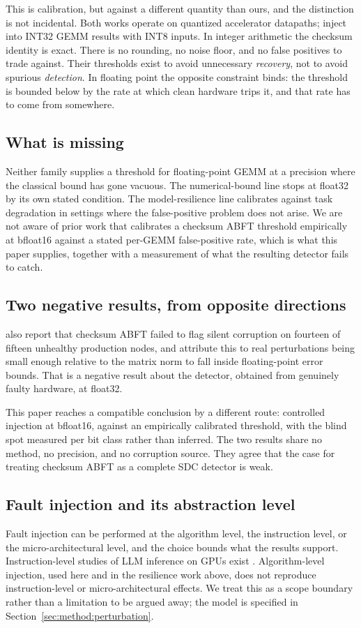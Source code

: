 This is calibration, but against a different quantity than ours, and the
distinction is not incidental. Both works operate on quantized accelerator
datapaths; \citet{xie2025realm} inject into INT32 GEMM results with INT8
inputs. In integer arithmetic the checksum identity is exact. There is no
rounding, no noise floor, and no false positives to trade against. Their
thresholds exist to avoid unnecessary \emph{recovery}, not to avoid spurious
\emph{detection}. In floating point the opposite constraint binds: the
threshold is bounded below by the rate at which clean hardware trips it, and
that rate has to come from somewhere.

\subsection{What is missing}

Neither family supplies a threshold for floating-point GEMM at a precision
where the classical bound has gone vacuous. The numerical-bound line stops at
float32 by its own stated condition. The model-resilience line calibrates
against task degradation in settings where the false-positive problem does not
arise. We are not aware of prior work that calibrates a checksum ABFT
threshold empirically at bfloat16 against a stated per-GEMM false-positive
rate, which is what this paper supplies, together with a measurement of what
the resulting detector fails to catch.

\subsection{Two negative results, from opposite directions}

\citet{ma2025understanding} also report that checksum ABFT failed to flag
silent corruption on fourteen of fifteen unhealthy production nodes, and
attribute this to real perturbations being small enough relative to the matrix
norm to fall inside floating-point error bounds. That is a negative result
about the detector, obtained from genuinely faulty hardware, at float32.

This paper reaches a compatible conclusion by a different route: controlled
injection at bfloat16, against an empirically calibrated threshold, with the
blind spot measured per bit class rather than inferred. The two results share
no method, no precision, and no corruption source. They agree that the case for
treating checksum ABFT as a complete SDC detector is weak.

\subsection{Fault injection and its abstraction level}

Fault injection can be performed at the algorithm level, the instruction level,
or the micro-architectural level, and the choice bounds what the results
support. Instruction-level studies of LLM inference on GPUs exist
\citep{chai2026llm}. Algorithm-level injection, used here and in the resilience
work above, does not reproduce instruction-level or micro-architectural
effects. We treat this as a scope boundary rather than a limitation to be
argued away; the model is specified in
Section~\ref{sec:method:perturbation}.
